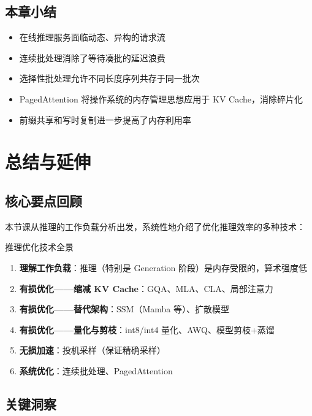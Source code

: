 \documentclass[a4paper]{article}
\begin{document}
\subsection{本章小结}

\begin{itemize}
    \item 在线推理服务面临动态、异构的请求流
    \item 连续批处理消除了等待凑批的延迟浪费
    \item 选择性批处理允许不同长度序列共存于同一批次
    \item PagedAttention 将操作系统的内存管理思想应用于 KV Cache，消除碎片化
    \item 前缀共享和写时复制进一步提高了内存利用率
\end{itemize}


\section{总结与延伸}

\subsection{核心要点回顾}

本节课从推理的工作负载分析出发，系统性地介绍了优化推理效率的多种技术：

\begin{importantbox}{推理优化技术全景}
\begin{enumerate}
    \item \textbf{理解工作负载}：推理（特别是 Generation 阶段）是内存受限的，算术强度低
    \item \textbf{有损优化——缩减 KV Cache}：GQA、MLA、CLA、局部注意力
    \item \textbf{有损优化——替代架构}：SSM（Mamba 等）、扩散模型
    \item \textbf{有损优化——量化与剪枝}：int8/int4 量化、AWQ、模型剪枝+蒸馏
    \item \textbf{无损加速}：投机采样（保证精确采样）
    \item \textbf{系统优化}：连续批处理、PagedAttention
\end{enumerate}
\end{importantbox}

\subsection{关键洞察}
\end{document}
